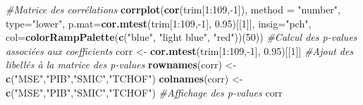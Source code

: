 \documentclass[11pt,]{article}
\newenvironment{Shaded}{\begin{snugshade}}{\end{snugshade}}
\newcommand{\KeywordTok}[1]{\textcolor[rgb]{0.13,0.29,0.53}{\textbf{{#1}}}}
\newcommand{\DataTypeTok}[1]{\textcolor[rgb]{0.13,0.29,0.53}{{#1}}}
\newcommand{\DecValTok}[1]{\textcolor[rgb]{0.00,0.00,0.81}{{#1}}}
\newcommand{\FloatTok}[1]{\textcolor[rgb]{0.00,0.00,0.81}{{#1}}}
\newcommand{\StringTok}[1]{\textcolor[rgb]{0.31,0.60,0.02}{{#1}}}
\newcommand{\CommentTok}[1]{\textcolor[rgb]{0.56,0.35,0.01}{\textit{{#1}}}}
\newcommand{\NormalTok}[1]{{#1}}
\begin{document}
\begin{Shaded}
\begin{Highlighting}[]
{\CommentTok{#Matrice des corrélations}
\KeywordTok{corrplot}\NormalTok{(}\KeywordTok{cor}\NormalTok{(trim[}\DecValTok{1}\NormalTok{:}\DecValTok{109}\NormalTok{,-}\DecValTok{1}\NormalTok{]), }\DataTypeTok{method =} \StringTok{"number"}\NormalTok{, }\DataTypeTok{type=}\StringTok{"lower"}\NormalTok{,}
         \DataTypeTok{p.mat=}\KeywordTok{cor.mtest}\NormalTok{(trim[}\DecValTok{1}\NormalTok{:}\DecValTok{109}\NormalTok{,-}\DecValTok{1}\NormalTok{], }\FloatTok{0.95}\NormalTok{)[[}\DecValTok{1}\NormalTok{]], }\DataTypeTok{insig=}\StringTok{"pch"}\NormalTok{,}
         \DataTypeTok{col=}\KeywordTok{colorRampPalette}\NormalTok{(}\KeywordTok{c}\NormalTok{(}\StringTok{"blue"}\NormalTok{, }\StringTok{"light blue"}\NormalTok{, }\StringTok{"red"}\NormalTok{))(}\DecValTok{50}\NormalTok{))}
\CommentTok{#Calcul des p-values associées aux coefficients}
\NormalTok{corr <-}\StringTok{ }\KeywordTok{cor.mtest}\NormalTok{(trim[}\DecValTok{1}\NormalTok{:}\DecValTok{109}\NormalTok{,-}\DecValTok{1}\NormalTok{], }\FloatTok{0.95}\NormalTok{)[[}\DecValTok{1}\NormalTok{]]}
\CommentTok{#Ajout des libellés à la matrice des p-values}
\KeywordTok{rownames}\NormalTok{(corr) <-}\StringTok{ }\KeywordTok{c}\NormalTok{(}\StringTok{"MSE"}\NormalTok{,}\StringTok{"PIB"}\NormalTok{,}\StringTok{"SMIC"}\NormalTok{,}\StringTok{"TCHOF"}\NormalTok{)}
\KeywordTok{colnames}\NormalTok{(corr) <-}\StringTok{ }\KeywordTok{c}\NormalTok{(}\StringTok{"MSE"}\NormalTok{,}\StringTok{"PIB"}\NormalTok{,}\StringTok{"SMIC"}\NormalTok{,}\StringTok{"TCHOF"}\NormalTok{)}
\CommentTok{#Affichage des p-values}
\NormalTok{corr}

}
\end{Highlighting}
\end{Shaded}
\end{document}

